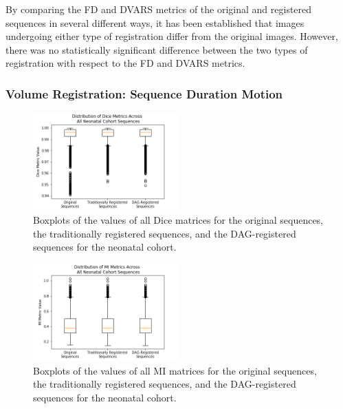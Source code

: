 By comparing the FD and DVARS metrics of the original and registered sequences in several different ways, it has been established that images undergoing either type of registration differ from the original images. However, there was no statistically significant difference between the two types of registration with respect to the FD and DVARS metrics.

\subsubsection{Volume Registration: Sequence Duration Motion}

\begin{figure}
\centering
\includegraphics[width=0.5\textwidth]{6/figures/neonates-dice-box.png}
\caption{Boxplots of the values of all Dice matrices for the original sequences, the traditionally registered sequences, and the DAG-registered sequences for the neonatal cohort.}
\label{fig:neonates-dice-box}
\end{figure}

\begin{figure}
\centering
\includegraphics[width=0.5\textwidth]{6/figures/neonates-mi-box.png}
\caption{Boxplots of the values of all MI matrices for the original sequences, the traditionally registered sequences, and the DAG-registered sequences for the neonatal cohort.}
\label{fig:neonates-mi-box}
\end{figure}

